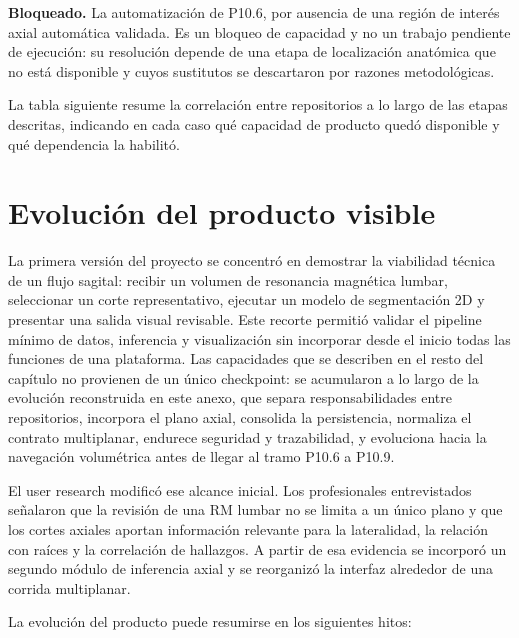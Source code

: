 \textbf{Bloqueado.} La automatización de P10.6, por ausencia de una región de interés axial automática validada. Es un bloqueo de capacidad y no un trabajo pendiente de ejecución: su resolución depende de una etapa de localización anatómica que no está disponible y cuyos sustitutos se descartaron por razones metodológicas.

La tabla siguiente resume la correlación entre repositorios a lo largo de las etapas descritas, indicando en cada caso qué capacidad de producto quedó disponible y qué dependencia la habilitó.

\section{Evolución del producto visible}
\label{anexo:f-evolucion-producto-visible}

La primera versión del proyecto se concentró en demostrar la viabilidad técnica de un flujo sagital: recibir un volumen de resonancia magnética lumbar, seleccionar un corte representativo, ejecutar un modelo de segmentación 2D y presentar una salida visual revisable. Este recorte permitió validar el pipeline mínimo de datos, inferencia y visualización sin incorporar desde el inicio todas las funciones de una plataforma. Las capacidades que se describen en el resto del capítulo no provienen de un único checkpoint: se acumularon a lo largo de la evolución reconstruida en este anexo, que separa responsabilidades entre repositorios, incorpora el plano axial, consolida la persistencia, normaliza el contrato multiplanar, endurece seguridad y trazabilidad, y evoluciona hacia la navegación volumétrica antes de llegar al tramo P10.6 a P10.9.

El user research modificó ese alcance inicial. Los profesionales entrevistados señalaron que la revisión de una RM lumbar no se limita a un único plano y que los cortes axiales aportan información relevante para la lateralidad, la relación con raíces y la correlación de hallazgos. A partir de esa evidencia se incorporó un segundo módulo de inferencia axial y se reorganizó la interfaz alrededor de una corrida multiplanar.

La evolución del producto puede resumirse en los siguientes hitos:

